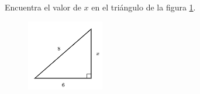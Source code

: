 \question[15]  Encuentra el valor de $x$ en el triángulo de la figura \ref{fig:lados_pitagoras_36}.
\begin{figure}[H]
    \begin{center}
        \includegraphics[width=0.3\textwidth]{../images/lados_pitagoras_36.png}
    \end{center}
    \caption{}
    \label{fig:lados_pitagoras_36}
\end{figure}